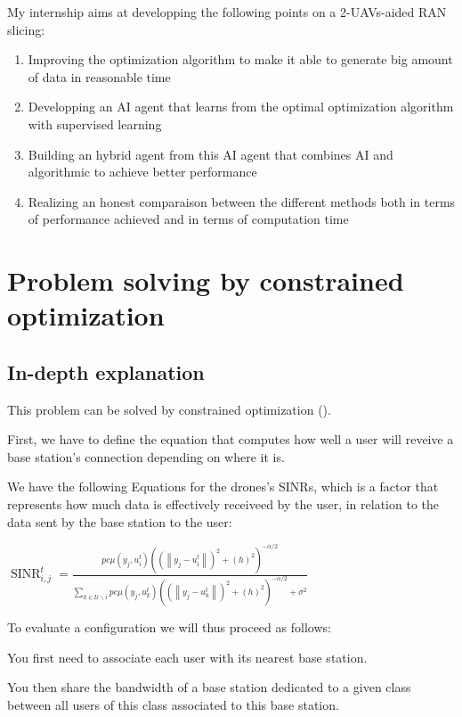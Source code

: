 \documentclass[letterpaper]{article}
\begin{document}
My internship aims at developping the following points on a 2-UAVs-aided RAN slicing:

\begin{enumerate}
    \item Improving the optimization algorithm to make it able to generate big amount of data in reasonable time
    \item Developping an AI agent that learns from the optimal optimization algorithm with supervised learning
    \item Building an hybrid agent from this AI agent that combines AI and algorithmic to achieve better performance
    \item Realizing an honest comparaison between the different methods both in terms of performance achieved and in terms of computation time
\end{enumerate}


\section{Problem solving by constrained optimization}

\subsection{In-depth explanation}

This problem can be solved by constrained optimization (\hspace{1sp}\cite{main_article}).

First, we have to define the equation that computes how well a user will reveive a base station's connection depending on where it is.

We have the following Equations for the drones's SINRs, which is a factor that represents how much data is effectively receiveed by the user, in relation to the data sent by the base station to the user:

$\operatorname{SINR}_{i, j}^t=\frac{p c \mu\left(y_j, u_i^t\right)\left(\left(\left\|y_j-u_i^t\right\|\right)^2+\left(h\right)^2\right)^{-\alpha / 2}}{\sum\limits_{k \in \mathcal{U} \backslash i} p c \mu\left(y_j, u_k^t\right)\left(\left(\left\|y_j-u_k^t\right\|\right)^2+\left(h\right)^2\right)^{-\alpha / 2}+\sigma^2}$

To evaluate a configuration we will thus proceed as follows:

You first need to associate each user with its nearest base station.

You then share the bandwidth of a base station dedicated to a given class between all users of this class associated to this base station.
\end{document}
